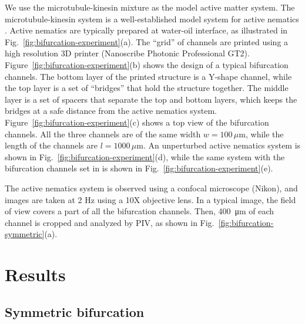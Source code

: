 \documentclass[%
10pt,
superscriptaddress,
twocolumn,
 amsmath,amssymb,
 aps,prx,
]{revtex4-2}
\begin{document}
We use the microtubule-kinesin mixture as the model active matter system. 
The microtubule-kinesin system is a well-established model system for active nematics \cite{Sanchez2012,Keber2014,Decamp2015,Hardouin2020}.
Active nematics are typically prepared at water-oil interface, as illustrated in Fig.~\ref{fig:bifurcation-experiment}(a). 
The ``grid'' of channels are printed using a high resolution 3D printer (Nanoscribe Photonic Professional GT2).
Figure~\ref{fig:bifurcation-experiment}(b) shows the design of a typical bifurcation channels.
The bottom layer of the printed structure is a Y-shape channel, while the top layer is a set of ``bridges'' that hold the structure together.
The middle layer is a set of spacers that separate the top and bottom layers, which keeps the bridges at a safe distance from the active nematics system.
Figure~\ref{fig:bifurcation-experiment}(c) shows a top view of the bifurcation channels.
All the three channels are of the same width $w=100\,\mu$m, while the length of the channels are $l=1000\,\mu$m.
An unperturbed active nematics system is shown in Fig.~\ref{fig:bifurcation-experiment}(d), while the same system with the bifurcation channels set in is shown in Fig.~\ref{fig:bifurcation-experiment}(e).

The active nematics system is observed using a confocal microscope (Nikon), and images are taken at 2 Hz using a 10X objective lens.
In a typical image, the field of view covers a part of all the bifurcation channels.
Then, \SI{400}{\micro\meter} of each channel is cropped and analyzed by PIV, as shown in Fig.~\ref{fig:bifurcation-symmetric}(a).

\section{Results}

\subsection{Symmetric bifurcation}
\end{document}
